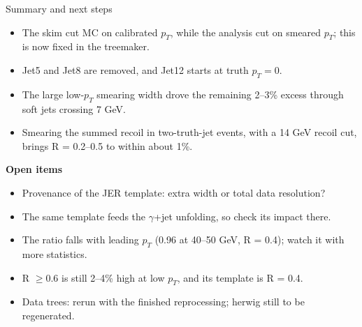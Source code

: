 \documentclass[aspectratio=169,10pt]{beamer}
\begin{document}
\begin{frame}{Summary and next steps}
  \begin{itemize}
    \item The skim cut MC on calibrated $p_T$, while the analysis cut on smeared $p_T$; this is now fixed in the treemaker.
    \item Jet5 and Jet8 are removed, and Jet12 starts at truth $p_T = 0$.
    \item The large low-$p_T$ smearing width drove the remaining 2--3\% excess through soft jets crossing 7 GeV.
    \item Smearing the summed recoil in two-truth-jet events, with a 14 GeV recoil cut, brings R = 0.2--0.5 to within about 1\%.
  \end{itemize}
  \vspace{0.5em}
  \textbf{Open items}
  \begin{itemize}
    \item Provenance of the JER template: extra width or total data resolution?
    \item The same template feeds the $\gamma$+jet unfolding, so check its impact there.
    \item The ratio falls with leading $p_T$ (0.96 at 40--50 GeV, R = 0.4); watch it with more statistics.
    \item R $\geq 0.6$ is still 2--4\% high at low $p_T$, and its template is R = 0.4.
    \item Data trees: rerun with the finished reprocessing; herwig still to be regenerated.
  \end{itemize}
\end{frame}
\end{document}
